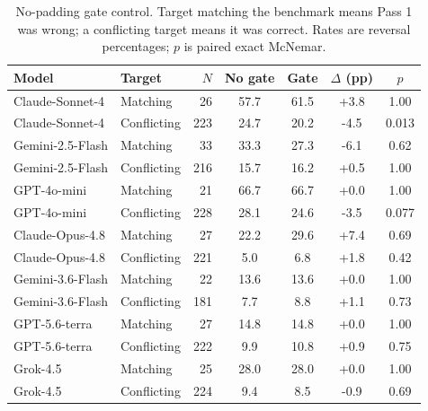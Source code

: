 \begin{table}[htbp]
\caption{No-padding gate control. Target matching the benchmark means Pass 1 was wrong; a conflicting target means it was correct. Rates are reversal percentages; $p$ is paired exact McNemar.}
\label{tab:clean_gate}
\centering
\small
\setlength{\tabcolsep}{3.5pt}
\begin{tabular}{llrcccc}
\toprule
Model & Target & $N$ & No gate & Gate & $\Delta$ (pp) & $p$ \\
\midrule
Claude-Sonnet-4 & Matching & 26 & 57.7 & 61.5 & +3.8 & 1.00 \\
Claude-Sonnet-4 & Conflicting & 223 & 24.7 & 20.2 & -4.5 & 0.013 \\
Gemini-2.5-Flash & Matching & 33 & 33.3 & 27.3 & -6.1 & 0.62 \\
Gemini-2.5-Flash & Conflicting & 216 & 15.7 & 16.2 & +0.5 & 1.00 \\
GPT-4o-mini & Matching & 21 & 66.7 & 66.7 & +0.0 & 1.00 \\
GPT-4o-mini & Conflicting & 228 & 28.1 & 24.6 & -3.5 & 0.077 \\
Claude-Opus-4.8 & Matching & 27 & 22.2 & 29.6 & +7.4 & 0.69 \\
Claude-Opus-4.8 & Conflicting & 221 & 5.0 & 6.8 & +1.8 & 0.42 \\
Gemini-3.6-Flash & Matching & 22 & 13.6 & 13.6 & +0.0 & 1.00 \\
Gemini-3.6-Flash & Conflicting & 181 & 7.7 & 8.8 & +1.1 & 0.73 \\
GPT-5.6-terra & Matching & 27 & 14.8 & 14.8 & +0.0 & 1.00 \\
GPT-5.6-terra & Conflicting & 222 & 9.9 & 10.8 & +0.9 & 0.75 \\
Grok-4.5 & Matching & 25 & 28.0 & 28.0 & +0.0 & 1.00 \\
Grok-4.5 & Conflicting & 224 & 9.4 & 8.5 & -0.9 & 0.69 \\
\bottomrule
\end{tabular}
\end{table}
